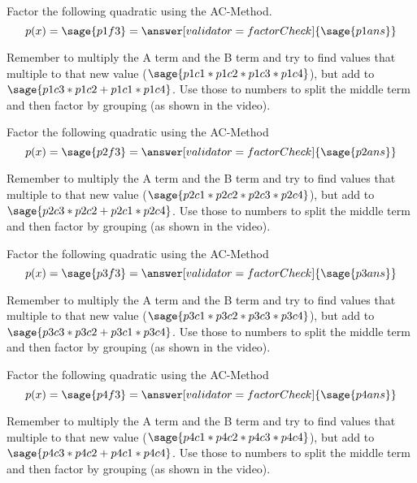 \documentclass{ximera}
\begin{document}
\begin{problem}
    Factor the following quadratic using the AC-Method.
    \[
        p(x) = \sage{p1f3} = \answer[validator=factorCheck]{\sage{p1ans}}
    \]
    \begin{feedback}
        Remember to multiply the A term and the B term and try to find values that multiple to that new value ($\sage{p1c1*p1c2*p1c3*p1c4}$), but add to $\sage{p1c3*p1c2+p1c1*p1c4}$. Use those to numbers to split the middle term and then factor by grouping (as shown in the video).
    \end{feedback}
\end{problem}



\begin{problem}
    Factor the following quadratic using the AC-Method
    \[
        p(x) = \sage{p2f3} = \answer[validator=factorCheck]{\sage{p2ans}}
    \]
    \begin{feedback}
        Remember to multiply the A term and the B term and try to find values that multiple to that new value ($\sage{p2c1*p2c2*p2c3*p2c4}$), but add to $\sage{p2c3*p2c2+p2c1*p2c4}$. Use those to numbers to split the middle term and then factor by grouping (as shown in the video).
    \end{feedback}
\end{problem}


\begin{problem}
    Factor the following quadratic using the AC-Method
    \[
        p(x) = \sage{p3f3} = \answer[validator=factorCheck]{\sage{p3ans}}
    \]
    \begin{feedback}
        Remember to multiply the A term and the B term and try to find values that multiple to that new value ($\sage{p3c1*p3c2*p3c3*p3c4}$), but add to $\sage{p3c3*p3c2+p3c1*p3c4}$. Use those to numbers to split the middle term and then factor by grouping (as shown in the video).
    \end{feedback}
\end{problem}



\begin{problem}
    Factor the following quadratic using the AC-Method
    \[
        p(x) = \sage{p4f3} = \answer[validator=factorCheck]{\sage{p4ans}}
    \]
    \begin{feedback}
        Remember to multiply the A term and the B term and try to find values that multiple to that new value ($\sage{p4c1*p4c2*p4c3*p4c4}$), but add to $\sage{p4c3*p4c2+p4c1*p4c4}$. Use those to numbers to split the middle term and then factor by grouping (as shown in the video).
    \end{feedback}
\end{problem}
\end{document}
